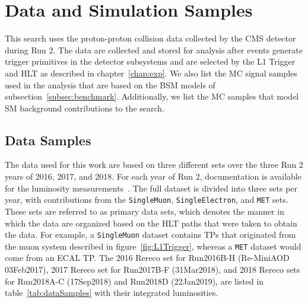 
\section{Data and Simulation Samples}
\label{sec:samples}

This search uses the proton-proton collision data collected by the CMS detector during Run 2.
The data are collected and stored for analysis after events generate trigger primitives in the detector subsystems and are selected by the L1 Trigger and HLT as described in chapter~\ref{chap:exp}.
We also list the MC signal samples used in the analysis that are based on the BSM models of subsection~\ref{subsec:benchmark}.
Additionally, we list the MC samples that model SM background contributions to the search.

\subsection{Data Samples}

The data used for this work are based on three different sets over the three Run 2 years of 2016, 2017, and 2018.
For each year of Run 2, documentation is available for the luminosity measurements~\cite{CMS-PAS-LUM-17-001,CMS-PAS-LUM-17-004,CMS-PAS-LUM-18-002}.
The full dataset is divided into three sets per year, with contributions from the \texttt{SingleMuon}, \texttt{SingleElectron}, and \texttt{MET} sets.
These sets are referred to as primary data sets, which denotes the manner in which the data are organized based on the HLT paths that were taken to obtain the data. %
For example, a \texttt{SingleMuon} dataset contains TPs that originated from the muon system described in figure~\ref{fig:L1Trigger}, whereas a \texttt{MET} dataset would come from an ECAL TP.
The 2016 Rereco set for Run2016B-H (Re-MiniAOD 03Feb2017), 2017 Rereco set for Run2017B-F (31Mar2018), and 2018 Rereco sets for Run2018A-C (17Sep2018) and Run2018D (22Jan2019), are listed in table~\ref{tab:dataSamples} with their integrated luminosities.


